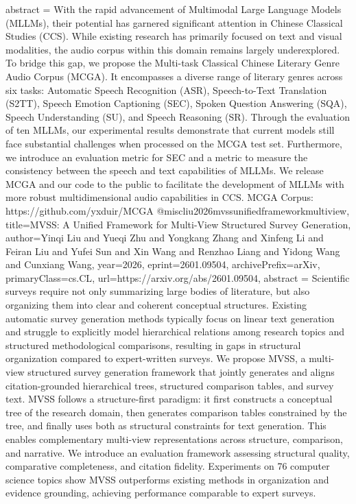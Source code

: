 {      abstract = {With the rapid advancement of Multimodal Large Language Models (MLLMs), their potential has garnered significant attention in Chinese Classical Studies (CCS). While existing research has primarily focused on text and visual modalities, the audio corpus within this domain remains largely underexplored. To bridge this gap, we propose the Multi-task Classical Chinese Literary Genre Audio Corpus (MCGA). It encompasses a diverse range of literary genres across six tasks: Automatic Speech Recognition (ASR), Speech-to-Text Translation (S2TT), Speech Emotion Captioning (SEC), Spoken Question Answering (SQA), Speech Understanding (SU), and Speech Reasoning (SR). Through the evaluation of ten MLLMs, our experimental results demonstrate that current models still face substantial challenges when processed on the MCGA test set. Furthermore, we introduce an evaluation metric for SEC and a metric to measure the consistency between the speech and text capabilities of MLLMs. We release MCGA and our code to the public to facilitate the development of MLLMs with more robust multidimensional audio capabilities in CCS. MCGA Corpus: https://github.com/yxduir/MCGA}
}@misc{liu2026mvssunifiedframeworkmultiview,
      title={MVSS: A Unified Framework for Multi-View Structured Survey Generation}, 
      author={Yinqi Liu and Yueqi Zhu and Yongkang Zhang and Xinfeng Li and Feiran Liu and Yufei Sun and Xin Wang and Renzhao Liang and Yidong Wang and Cunxiang Wang},
      year={2026},
      eprint={2601.09504},
      archivePrefix={arXiv},
      primaryClass={cs.CL},
      url={https://arxiv.org/abs/2601.09504},
      abstract = {Scientific surveys require not only summarizing large bodies of literature, but also organizing them into clear and coherent conceptual structures. Existing automatic survey generation methods typically focus on linear text generation and struggle to explicitly model hierarchical relations among research topics and structured methodological comparisons, resulting in gaps in structural organization compared to expert-written surveys. We propose MVSS, a multi-view structured survey generation framework that jointly generates and aligns citation-grounded hierarchical trees, structured comparison tables, and survey text. MVSS follows a structure-first paradigm: it first constructs a conceptual tree of the research domain, then generates comparison tables constrained by the tree, and finally uses both as structural constraints for text generation. This enables complementary multi-view representations across structure, comparison, and narrative. We introduce an evaluation framework assessing structural quality, comparative completeness, and citation fidelity. Experiments on 76 computer science topics show MVSS outperforms existing methods in organization and evidence grounding, achieving performance comparable to expert surveys.}
}
